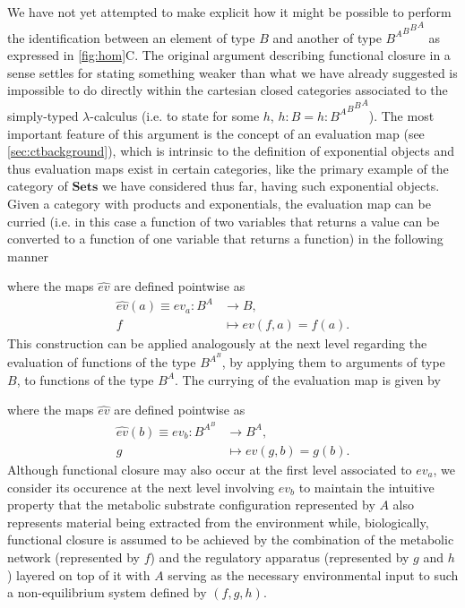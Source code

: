 \documentclass[10pt]{article}
\theoremstyle{plain}
\theoremstyle{definition}
\theoremstyle{remark}
\begin{document}
We have not yet attempted to make explicit how it might be possible to perform the identification between an element of type $B$ and another of type ${{{{B^A}^B}^B}^A}$ as expressed in \ref{fig:hom}C. The original argument describing functional closure in a sense settles for stating something weaker than what we have already suggested is impossible to do directly within the cartesian closed categories associated to the simply-typed $\lambda$-calculus (i.e. to state for some $h$, $h:B = h:{{{{B^A}^B}^B}^A}$). The most important feature of this argument is the concept of an evaluation map (see \ref{sec:ctbackground}), which is intrinsic to the definition of exponential objects and thus evaluation maps exist in certain categories, like the primary example of the category of $\mathbf{Sets}$ we have considered thus far, having such exponential objects. Given a category with products and exponentials, the evaluation map can be curried (i.e. in this case a function of two variables that returns a value can be converted to a function of one variable that returns a function) in the following manner
\begin{prooftree}
\end{prooftree}
where the maps $\hat{ev}$ are defined pointwise as
\begin{align*}
\hat{ev}(a) \equiv ev_a \colon B^A &\longrightarrow B,\\
f &\longmapsto ev(f,a) = f(a).
\end{align*}
This construction can be applied analogously at the next level regarding the evaluation of functions of the type $B^{A^B}$, by applying them to arguments of type $B$, to functions of the type $B^A$. The currying of the evaluation map is given by
\begin{prooftree}
\end{prooftree}
where the maps $\hat{ev}$ are defined pointwise as
\begin{align*}
\hat{ev}(b) \equiv ev_b \colon B^{A^B} &\longrightarrow B^A,\\
g &\longmapsto ev(g,b) = g(b).
\end{align*}
Although functional closure may also occur at the first level associated to $ev_a$, we consider its occurence at the next level involving $ev_b$ to maintain the intuitive property that the metabolic substrate configuration represented by $A$ also represents material being extracted from the environment while, biologically, functional closure is assumed to be achieved by the combination of the metabolic network (represented by $f$) and the regulatory apparatus (represented by $g$ and $h$) layered on top of it with $A$ serving as the necessary environmental input to such a non-equilibrium system defined by $(f,g,h)$.
\end{document}
